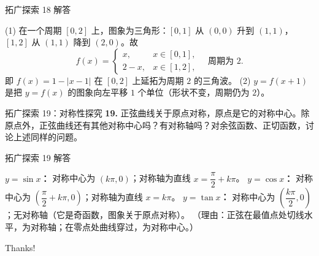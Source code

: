 \documentclass[10pt,aspectratio=169,serif]{beamer}
\begin{document}
\begin{frame}[t]{拓广探索 18 解答}
\begin{tcolorbox}[colback=orange!10,colframe=orange,title=\textbf{解}]
(1) 在一个周期 $[0,2]$ 上，图象为三角形：$[0,1]$ 从 $(0,0)$ 升到 $(1,1)$，$[1,2]$ 从 $(1,1)$ 降到 $(2,0)$。故
\[
f(x)=
\begin{cases}
x, & x\in[0,1],\\
2-x, & x\in[1,2],
\end{cases}
\quad \text{周期为 }2.
\]
即 $f(x)=1-|x-1|$ 在 $[0,2]$ 上延拓为周期 $2$ 的三角波。
\vspace{0.3em}
(2) $y=f(x+1)$ 是把 $y=f(x)$ 的图象\alert{向左平移 $1$ 个单位}（形状不变，周期仍为 $2$）。
\end{tcolorbox}
\end{frame}

\begin{frame}[t]{拓广探索 19：对称性探究}
\textbf{19.} 正弦曲线关于原点对称，原点是它的对称中心。除原点外，正弦曲线还有其他对称中心吗？有对称轴吗？对余弦函数、正切函数，讨论上述同样的问题。
\end{frame}

\begin{frame}[t]{拓广探索 19 解答}
\begin{tcolorbox}[colback=orange!10,colframe=orange,title=\textbf{参考结论}]
\textbf{$y=\sin x$：} 对称中心为 $(k\pi,0)$；对称轴为直线 $x=\dfrac{\pi}{2}+k\pi$。
\vspace{0.2em}
\textbf{$y=\cos x$：} 对称中心为 $\left(\dfrac{\pi}{2}+k\pi,0\right)$；对称轴为直线 $x=k\pi$。
\vspace{0.2em}
\textbf{$y=\tan x$：} 对称中心为 $\left(\dfrac{k\pi}{2},0\right)$；无对称轴（它是奇函数，图象关于原点对称）。
\vspace{0.3em}
\small（理由：正弦在最值点处切线水平，为对称轴；在零点处曲线穿过，为对称中心。）
\end{tcolorbox}
\end{frame}

\begin{frame}[c]
  \begin{center}
    {\Huge\calligra Thanks!}
  \end{center}
\end{frame}
\end{document}
